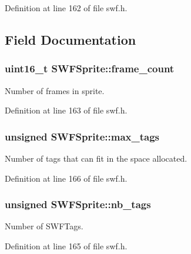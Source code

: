 Definition at line 162 of file swf.\-h.



\subsection{Field Documentation}
\hypertarget{struct_s_w_f_sprite_a952578e82c9d1dad81bbb086cb8ec1c2}{
\subsubsection[{frame\-\_\-count}]{\setlength{\rightskip}{0pt plus 5cm}uint16\-\_\-t S\-W\-F\-Sprite\-::frame\-\_\-count}}\label{struct_s_w_f_sprite_a952578e82c9d1dad81bbb086cb8ec1c2}


Number of frames in sprite. 



Definition at line 163 of file swf.\-h.

\hypertarget{struct_s_w_f_sprite_a508a2dc2cceb78be54bf2c40a1665236}{
\subsubsection[{max\-\_\-tags}]{\setlength{\rightskip}{0pt plus 5cm}unsigned S\-W\-F\-Sprite\-::max\-\_\-tags}}\label{struct_s_w_f_sprite_a508a2dc2cceb78be54bf2c40a1665236}


Number of tags that can fit in the space allocated. 



Definition at line 166 of file swf.\-h.

\hypertarget{struct_s_w_f_sprite_a9eae389efaf36d5ebf4e1e31edf2f05e}{
\subsubsection[{nb\-\_\-tags}]{\setlength{\rightskip}{0pt plus 5cm}unsigned S\-W\-F\-Sprite\-::nb\-\_\-tags}}\label{struct_s_w_f_sprite_a9eae389efaf36d5ebf4e1e31edf2f05e}


Number of S\-W\-F\-Tags. 



Definition at line 165 of file swf.\-h.

